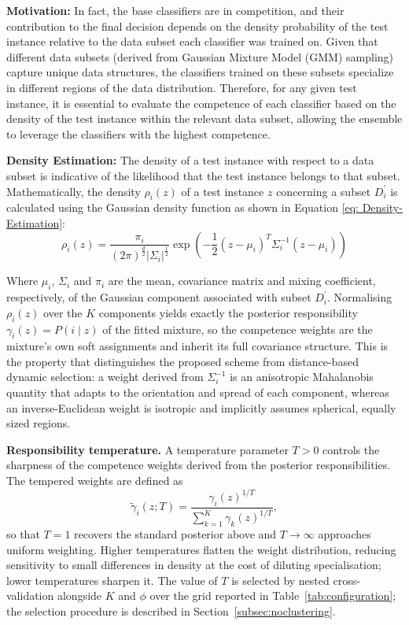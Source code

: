 \documentclass[lettersize,journal]{IEEEtran}
\begin{document}
	\textbf{Motivation:} In fact, the base classifiers are in competition, and their contribution to the final decision depends on the density probability of the test instance relative to the data subset each classifier was trained on. Given that different data subsets (derived from Gaussian Mixture Model (GMM) sampling) capture unique data structures, the classifiers trained on these subsets specialize in different regions of the data distribution. Therefore, for any given test instance, it is essential to evaluate the competence of each classifier based on the density of the test instance within the relevant data subset, allowing the ensemble to leverage the classifiers with the highest competence.
	
	\textbf{Density Estimation:} The density of a test instance with respect to a data subset is indicative of the likelihood that the test instance belongs to that subset. Mathematically, the density $\rho_i(z)$ of a test instance $z$ concerning a subset $D_i^{\prime}$ is calculated using the Gaussian density function as shown in Equation \ref{eq: Density-Estimation}:
	\begin{equation}\label{eq: Density-Estimation}
		\rho_i(z)=\frac{\pi_i}{(2 \pi)^{\frac{d}{2}}\left|\Sigma_i\right|^{\frac{1}{2}}} \exp \left(-\frac{1}{2}\left(z-\mu_i\right)^T \Sigma_i^{-1}\left(z-\mu_i\right)\right)
	\end{equation}
	
	Where $\mu_i$, $\Sigma_i$ and $\pi_i$ are the mean, covariance matrix and mixing
	coefficient, respectively, of the Gaussian component associated with subset
	$D_i^{\prime}$. Normalising $\rho_i(z)$ over the $K$ components yields exactly the
	posterior responsibility $\gamma_i(z) = P(i \mid z)$ of the fitted mixture, so the
	competence weights are the mixture's own soft assignments and inherit its full
	covariance structure. This is the property that distinguishes the proposed scheme from
	distance-based dynamic selection: a weight derived from $\Sigma_i^{-1}$ is an
	anisotropic Mahalanobis quantity that adapts to the orientation and spread of each
	component, whereas an inverse-Euclidean weight is isotropic and implicitly assumes
	spherical, equally sized regions.

	\textbf{Responsibility temperature.} A temperature parameter $T > 0$ controls the
	sharpness of the competence weights derived from the posterior responsibilities. The
	tempered weights are defined as
	\begin{equation}\label{eq:temperature}
		\tilde{\gamma}_i(z; T) = \frac{\gamma_i(z)^{1/T}}{\sum_{k=1}^{K} \gamma_k(z)^{1/T}},
	\end{equation}
	so that $T = 1$ recovers the standard posterior above and $T \to \infty$ approaches
	uniform weighting. Higher temperatures flatten the weight distribution, reducing
	sensitivity to small differences in density at the cost of diluting specialisation;
	lower temperatures sharpen it. The value of $T$ is selected by nested cross-validation
	alongside $K$ and $\phi$ over the grid reported in Table~\ref{tab:configuration}; the
	selection procedure is described in Section~\ref{subsec:noclustering}.
\end{document}

